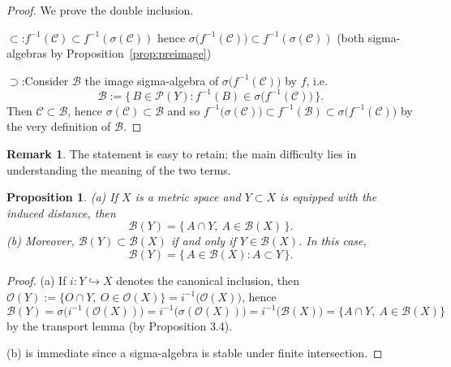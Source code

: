 \documentclass[11pt]{article}
\newtheorem{proposition}{Proposition}[section]
\theoremstyle{definition}
\newtheorem{remark}{Remark}[section]
\begin{document}
\begin{proof}
We prove the double inclusion.

\noindent$\subset$:\quad $f^{-1}(\mathscr C)\subset f^{-1}(\sigma(\mathscr C))$ hence $\sigma\bigl(f^{-1}(\mathscr C)\bigr)\subset f^{-1}(\sigma(\mathscr C))$ (both sigma-algebras by Proposition~\ref{prop:preimage})

\noindent$\supset$:\quad Consider $\mathcal B$ the image sigma-algebra of $\sigma\bigl(f^{-1}(\mathscr C)\bigr)$ by $f$, i.e.
\[
\mathcal B:=\{\,B\in\mathcal P(Y): f^{-1}(B)\in \sigma\bigl(f^{-1}(\mathscr C)\bigr)\,\}.
\]
Then $\mathscr C\subset\mathcal B$, hence $\sigma(\mathscr C)\subset\mathcal B$ and so $f^{-1}\bigl(\sigma(\mathscr C)\bigr)\subset f^{-1}(\mathcal B)\subset \sigma\bigl(f^{-1}(\mathscr C)\bigr)$ by the very definition of $\mathcal B$.

\medskip\noindent

\end{proof}

\begin{remark}
The statement is easy to retain; the main difficulty lies in understanding the meaning of the two terms.
\end{remark}

\begin{proposition}\label{prop:traceBorel}
(a) If $X$ is a metric space and $Y\subset X$ is equipped with the induced distance, then
\[
\mathcal B(Y)=\{\,A\cap Y,\ A\in\mathcal B(X)\,\}.
\]
(b) Moreover, $\mathcal B(Y)\subset\mathcal B(X)$ if and only if $Y\in\mathcal B(X)$. In this case,
\[
\mathcal B(Y)=\{\,A\in\mathcal B(X): A\subset Y\,\}.
\]
\end{proposition}

\begin{proof}
(a) If $i:Y\hookrightarrow X$ denotes the canonical inclusion, then $\mathcal O(Y):=\{O\cap Y,\ O\in\mathcal O(X)\}=i^{-1}\bigl(\mathcal O(X)\bigr)$, hence
\[
\mathcal B(Y)=\sigma\bigl(i^{-1}(\mathcal O(X))\bigr)=i^{-1}\bigl(\sigma(\mathcal O(X))\bigr)=i^{-1}\bigl(\mathcal B(X)\bigr)=\{A\cap Y,\ A\in\mathcal B(X)\}
\]
by the transport lemma (by Proposition 3.4).
\quad

(b) is immediate since a sigma-algebra is stable under finite intersection.
\end{proof}
\end{document}
